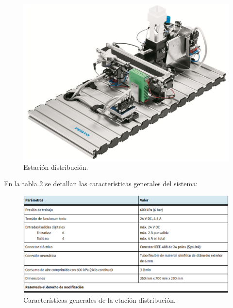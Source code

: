 \begin{figure} [h!]
  \begin{center}
    \includegraphics[width=12.5cm]{figs/estacion_distribucion_1}
  \end{center}
  \caption{\centering Estación distribución. \cite{estacion_distribucion}}
  \label{fig:estacion_distribucion_1}
\end{figure} 

En la tabla \ref{fig:estacion_distribucion_3} se detallan las características generales del sistema:

\begin{figure} [h!]
  \begin{center}
    \includegraphics[width=15cm]{figs/estacion_distribucion_3}
  \end{center}
  \caption{\centering Características generales de la etación distribución. \cite{estacion_distribucion}}
  \label{fig:estacion_distribucion_3}
\end{figure} 

\clearpage

